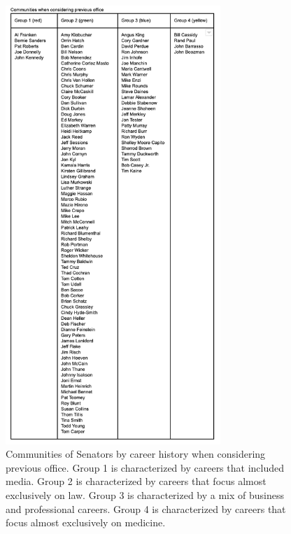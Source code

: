 \documentclass[11pt,twocolumn]{article}
\begin{document}
\begin{figure}[H]
    \centering
    \includegraphics[width=3.2in]{comm_office}
    \caption{Communities of Senators by career history when considering previous office. \newline Group 1 is characterized by careers that included media. \newline Group 2 is characterized by careers that focus almost exclusively on law. \newline Group 3 is characterized by a mix of business and professional careers. \newline Group 4 is characterized by careers that focus almost exclusively on medicine.}
    \label{fig:ds}
\end{figure}
\end{document}
